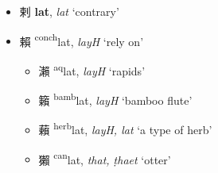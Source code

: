 \begin{itemize}
  \item {\Large{剌}} %
    {\large{\textbf{lat}}},
    \textit{lat} `contrary' %

  \item {\Large{賴}} %
    {\large{{\textsuperscript{conch}}lat}},
    \textit{layH} `rely on' %
\begin{itemize}
  \item {\Large{瀨}} %
    {\large{{\textsuperscript{aq}}lat}},
    \textit{layH} `rapids' %

  \item {\Large{籟}} %
    {\large{{\textsuperscript{bamb}}lat}},
    \textit{layH} `bamboo flute' %

  \item {\Large{藾}} %
    {\large{{\textsuperscript{herb}}lat}},
    \textit{layH, lat} `a type of herb' %

  \item {\Large{獺}} %
    {\large{{\textsuperscript{can}}lat}},
    \textit{that, ṭhaet} `otter' %
\end{itemize}
\end{itemize}


